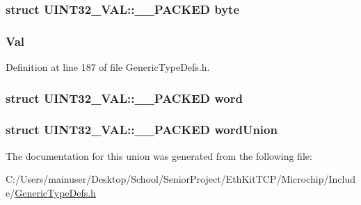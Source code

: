 \subsubsection[{byte}]{\setlength{\rightskip}{0pt plus 5cm}struct {\bf U\+I\+N\+T32\+\_\+\+V\+A\+L\+::\+\_\+\+\_\+\+P\+A\+C\+K\+E\+D}  byte}\label{union_u_i_n_t32___v_a_l_a0a29939c26754944b3f1e6c3f2eddd50}
\hypertarget{union_u_i_n_t32___v_a_l_a527005b57a2b53412e52f63dcfa2f61b}{}
\subsubsection[{Val}]{ Val}\label{union_u_i_n_t32___v_a_l_a527005b57a2b53412e52f63dcfa2f61b}


Definition at line 187 of file Generic\+Type\+Defs.\+h.

\hypertarget{union_u_i_n_t32___v_a_l_ae2346b794b5d9cf89e58ecf390a2680e}{}
\subsubsection[{word}]{\setlength{\rightskip}{0pt plus 5cm}struct {\bf U\+I\+N\+T32\+\_\+\+V\+A\+L\+::\+\_\+\+\_\+\+P\+A\+C\+K\+E\+D}  word}\label{union_u_i_n_t32___v_a_l_ae2346b794b5d9cf89e58ecf390a2680e}
\hypertarget{union_u_i_n_t32___v_a_l_a71f9132c3cce99757210e63429f10b3c}{}
\subsubsection[{word\+Union}]{\setlength{\rightskip}{0pt plus 5cm}struct {\bf U\+I\+N\+T32\+\_\+\+V\+A\+L\+::\+\_\+\+\_\+\+P\+A\+C\+K\+E\+D} word\+Union}\label{union_u_i_n_t32___v_a_l_a71f9132c3cce99757210e63429f10b3c}


The documentation for this union was generated from the following file\+:\begin{DoxyCompactItemize}
\item 
C\+:/\+Users/mainuser/\+Desktop/\+School/\+Senior\+Project/\+Eth\+Kit\+T\+C\+P/\+Microchip/\+Include/\hyperlink{_generic_type_defs_8h}{Generic\+Type\+Defs.\+h}\end{DoxyCompactItemize}
